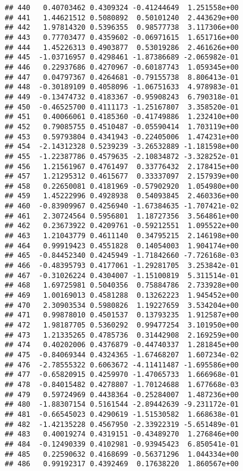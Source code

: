 \documentclass[
]{article}
\begin{document}
\begin{verbatim}
## 440   0.40703462 0.4309324 -0.41244649  1.251558e+00
## 441   1.44621512 0.5080892  0.50101240  2.443629e+00
## 442   1.97814320 0.5396355  0.98577738  3.117306e+00
## 443   0.77703477 0.4359602 -0.06971615  1.651716e+00
## 444   1.45226313 0.4903877  0.53019286  2.461626e+00
## 445  -1.03716957 0.4298461 -1.87386689 -2.065982e-01
## 446   0.22937686 0.4270967 -0.60187743  1.059345e+00
## 447   0.04797367 0.4264681 -0.79155738  8.806413e-01
## 448  -0.30189109 0.4058096 -1.06751633  4.978983e-01
## 449  -0.13474732 0.4183367 -0.95908243  6.790318e-01
## 450  -0.46525700 0.4111173 -1.25167807  3.358520e-01
## 451   0.40066061 0.4185360 -0.41749886  1.232410e+00
## 452   0.79085755 0.4510487 -0.05590414  1.703119e+00
## 453   0.59793804 0.4341943 -0.22405006  1.474231e+00
## 454  -2.14312328 0.5239239 -3.26532889 -1.181598e+00
## 455  -1.22387786 0.4579635 -2.10834872 -3.328252e-01
## 456   1.21561967 0.4761497  0.33776432  2.178415e+00
## 457   1.21295312 0.4615677  0.33337097  2.157939e+00
## 458   0.22650081 0.4181969 -0.57902920  1.054980e+00
## 459   1.45222996 0.4928938  0.54093845  2.460336e+00
## 460  -0.83909967 0.4256940 -1.67384635 -1.707421e-02
## 461   2.30724564 0.5956801  1.18727356  3.564861e+00
## 462   0.23673922 0.4209761 -0.59212551  1.095522e+00
## 463   1.21043779 0.4611140  0.34795215  2.146198e+00
## 464   0.99919423 0.4551828  0.14054003  1.904174e+00
## 465  -0.84452340 0.4245949 -1.71842660 -7.726168e-03
## 466  -0.48395793 0.4177061 -1.29281705  3.253842e-01
## 467  -0.31026224 0.4304007 -1.15100819  5.311514e-01
## 468   1.69725981 0.5040356  0.75884786  2.733928e+00
## 469   1.00169013 0.4581288  0.13262223  1.945452e+00
## 470   2.30903534 0.5980826  1.19227659  3.534204e+00
## 471   0.99878010 0.4501537  0.13793235  1.912587e+00
## 472   1.98187705 0.5360292  0.99477254  3.101950e+00
## 473   1.21335265 0.4785736  0.31442908  2.169259e+00
## 474   0.40202006 0.4376879 -0.44740337  1.281845e+00
## 475  -0.84069344 0.4324365 -1.67468207  1.607234e-02
## 476  -2.78555322 0.6063672 -4.11411487 -1.695586e+00
## 477  -0.65820915 0.4259970 -1.47065733  1.666968e-01
## 478  -0.84015482 0.4278807 -1.70124688  1.677668e-03
## 479   0.59724969 0.4438364 -0.25284007  1.487236e+00
## 480  -1.88307154 0.5161544 -2.89442639 -9.231172e-01
## 481  -0.66545023 0.4290619 -1.51530582  1.668638e-01
## 482  -1.42135228 0.4567950 -2.33922319 -5.651489e-01
## 483   0.40019274 0.4319151 -0.43489270  1.276846e+00
## 484  -0.12490339 0.4102981 -0.93945423  6.850541e-01
## 485   0.22590632 0.4168699 -0.56371296  1.044334e+00
## 486   0.99192317 0.4392469  0.17638220  1.860567e+00

\end{verbatim}
\end{document}
